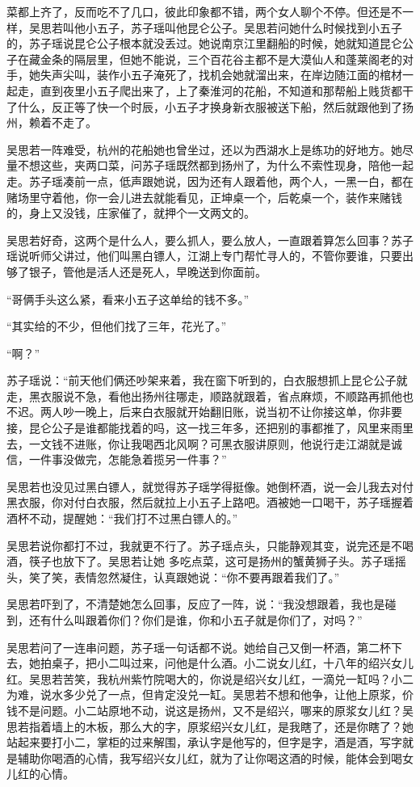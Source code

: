 菜都上齐了，反而吃不了几口，彼此印象都不错，两个女人聊个不停。但还是不一样，吴思若叫他小五子，苏子瑶叫他昆仑公子。吴思若问她什么时候找到小五子的，苏子瑶说昆仑公子根本就没丢过。她说南京江里翻船的时候，她就知道昆仑公子在藏金条的隔层里，但她不能说，三个百花谷主都不是大漠仙人和蓬莱阁老的对手，她失声尖叫，装作小五子淹死了，找机会她就溜出来，在岸边随江面的棺材一起走，直到夜里小五子爬出来了，上了秦淮河的花船，不知道和那帮船上贱货都干了什么，反正等了快一个时辰，小五子才换身新衣服被送下船，然后就跟他到了扬州，赖着不走了。

吴思若一阵难受，杭州的花船她也曾坐过，还以为西湖水上是练功的好地方。她尽量不想这些，夹两口菜，问苏子瑶既然都到扬州了，为什么不索性现身，陪他一起走。苏子瑶凑前一点，低声跟她说，因为还有人跟着他，两个人，一黑一白，都在赌场里守着他，你一会儿进去就能看见，正坤桌一个，后乾桌一个，装作来赌钱的，身上又没钱，庄家催了，就押个一文两文的。

吴思若好奇，这两个是什么人，要么抓人，要么放人，一直跟着算怎么回事？苏子瑶说听师父讲过，他们叫黑白镖人，江湖上专门帮忙寻人的，不管你要谁，只要出够了银子，管他是活人还是死人，早晚送到你面前。

“哥俩手头这么紧，看来小五子这单给的钱不多。”

“其实给的不少，但他们找了三年，花光了。”

“啊？”

苏子瑶说：“前天他们俩还吵架来着，我在窗下听到的，白衣服想抓上昆仑公子就走，黑衣服说不急，看他出扬州往哪走，顺路就跟着，省点麻烦，不顺路再抓他也不迟。两人吵一晚上，后来白衣服就开始翻旧账，说当初不让你接这单，你非要接，昆仑公子是谁都能找着的吗，这一找三年多，还把别的事都推了，风里来雨里去，一文钱不进账，你让我喝西北风啊？可黑衣服讲原则，他说行走江湖就是诚信，一件事没做完，怎能急着揽另一件事？”

吴思若也没见过黑白镖人，就觉得苏子瑶学得挺像。她倒杯酒，说一会儿我去对付黑衣服，你对付白衣服，然后就拉上小五子上路吧。酒被她一口喝干，苏子瑶握着酒杯不动，提醒她：“我们打不过黑白镖人的。”

吴思若说你都打不过，我就更不行了。苏子瑶点头，只能静观其变，说完还是不喝酒，筷子也放下了。吴思若让她
多吃点菜，这可是扬州的蟹黄狮子头。苏子瑶摇头，笑了笑，表情忽然凝住，认真跟她说：“你不要再跟着我们了。”

吴思若吓到了，不清楚她怎么回事，反应了一阵，说：“我没想跟着，我也是碰到，还有什么叫跟着你们？你们是谁，你和小五子就是你们了，对吗？”

吴思若问了一连串问题，苏子瑶一句话都不说。她给自己又倒一杯酒，第二杯下去，她拍桌子，把小二叫过来，问他是什么酒。小二说女儿红，十八年的绍兴女儿红。吴思若苦笑，我杭州紫竹院喝大的，你说是绍兴女儿红，一滴兑一缸吗？小二为难，说水多少兑了一点，但肯定没兑一缸。吴思若不想和他争，让他上原浆，价钱不是问题。小二站原地不动，说这是扬州，又不是绍兴，哪来的原浆女儿红？吴思若指着墙上的木板，那么大的字，原浆绍兴女儿红，是我瞎了，还是你瞎了？她站起来要打小二，掌柜的过来解围，承认字是他写的，但字是字，酒是酒，写字就是辅助你喝酒的心情，我写绍兴女儿红，就为了让你喝这酒的时候，能体会到喝女儿红的心情。

